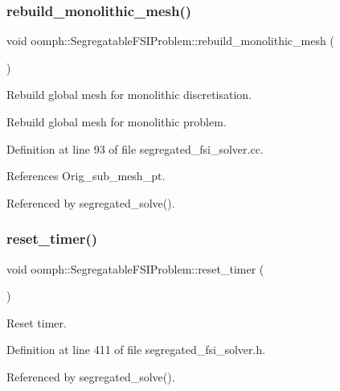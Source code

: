 \subsubsection{\texorpdfstring{rebuild\+\_\+monolithic\+\_\+mesh()}{rebuild\_monolithic\_mesh()}}
{\footnotesize\ttfamily void oomph\+::\+Segregatable\+F\+S\+I\+Problem\+::rebuild\+\_\+monolithic\+\_\+mesh (\begin{DoxyParamCaption}{ }\end{DoxyParamCaption})\hspace{0.3cm}{\ttfamily [protected]}}



Rebuild global mesh for monolithic discretisation. 

Rebuild global mesh for monolithic problem. 

Definition at line 93 of file segregated\+\_\+fsi\+\_\+solver.\+cc.



References Orig\+\_\+sub\+\_\+mesh\+\_\+pt.



Referenced by segregated\+\_\+solve().

\mbox{\label{classoomph_1_1SegregatableFSIProblem_a61ae984ed6baba413b7577ce1d1b5dc3}} 
\subsubsection{\texorpdfstring{reset\+\_\+timer()}{reset\_timer()}}
{\footnotesize\ttfamily void oomph\+::\+Segregatable\+F\+S\+I\+Problem\+::reset\+\_\+timer (\begin{DoxyParamCaption}{ }\end{DoxyParamCaption})\hspace{0.3cm}{\ttfamily [inline]}}



Reset timer. 



Definition at line 411 of file segregated\+\_\+fsi\+\_\+solver.\+h.



Referenced by segregated\+\_\+solve().

\mbox{\label{classoomph_1_1SegregatableFSIProblem_a2896156c47a5a6c2e7a390057d394e10}} 
